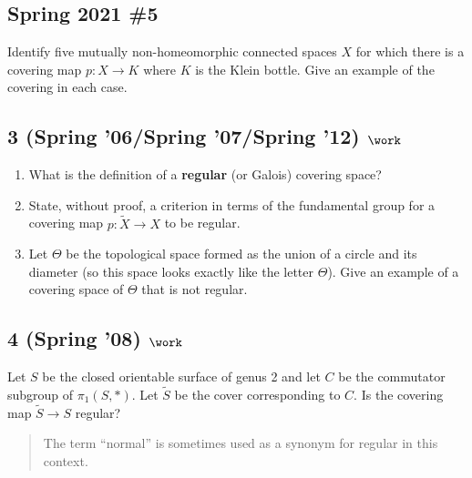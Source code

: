 \hypertarget{spring-2021-5}{%
\subsection{Spring 2021 \#5}\label{spring-2021-5}}

\begin{problem}[Spring 2021, 5]

Identify five mutually non-homeomorphic connected spaces \(X\) for which
there is a covering map \(p:X\to K\) where \(K\) is the Klein bottle.
Give an example of the covering in each case.

\end{problem}

\hypertarget{spring-06spring-07spring-12-work}{%
\subsection{\texorpdfstring{3 (Spring '06/Spring '07/Spring '12)
\(\work\)}{3 (Spring '06/Spring '07/Spring '12) \textbackslash work}}\label{spring-06spring-07spring-12-work}}

\begin{enumerate}
\def\labelenumi{\alph{enumi}.}
\item
  What is the definition of a \textbf{regular} (or Galois) covering
  space?
\item
  State, without proof, a criterion in terms of the fundamental group
  for a covering map \(p : \tilde X \to X\) to be regular.
\item
  Let \(\Theta\) be the topological space formed as the union of a
  circle and its diameter (so this space looks exactly like the letter
  \(\Theta\)). Give an example of a covering space of \(\Theta\) that is
  not regular.
\end{enumerate}

\hypertarget{spring-08-work-1}{%
\subsection{\texorpdfstring{4 (Spring '08)
\(\work\)}{4 (Spring '08) \textbackslash work}}\label{spring-08-work-1}}

Let \(S\) be the closed orientable surface of genus 2 and let \(C\) be
the commutator subgroup of \(\pi_1 (S, \ast)\). Let \(\tilde S\) be the
cover corresponding to \(C\). Is the covering map \(\tilde S \to S\)
regular?

\begin{quote}
The term ``normal'' is sometimes used as a synonym for regular in this
context.
\end{quote}

